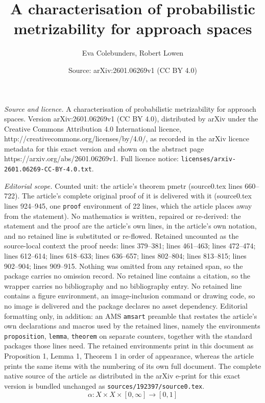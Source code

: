 \documentclass[10pt,a4paper]{amsart}
\title{A characterisation of probabilistic metrizability for approach spaces}
\author{Eva Colebunders, Robert Lowen}
\date{Source: arXiv:2601.06269v1 (CC BY 4.0)}
\renewcommand{\a}{\ensuremath{\alpha}}
\def\rw{\rightarrow}
\begin{document}
\maketitle

\noindent\emph{Source and licence.} A characterisation of probabilistic metrizability for approach spaces. Version arXiv:2601.06269v1 (CC BY 4.0), distributed by arXiv under the Creative Commons Attribution 4.0 International licence, http://creativecommons.org/licenses/by/4.0/, as recorded in the arXiv licence metadata for this exact version and shown on the abstract page https://arxiv.org/abs/2601.06269v1. Full licence notice: \texttt{licenses/arxiv-2601.06269-CC-BY-4.0.txt}.\par\smallskip

\noindent\textit{Editorial scope.} Counted unit: the article's theorem pmetr (source0.tex lines 660--722). The article's complete original proof of it is delivered with it (source0.tex lines 924--945, one \texttt{proof} environment of 22 lines, which the article places away from the statement). No mathematics is written, repaired or re-derived: the statement and the proof are the article's own lines, in the article's own notation, and no retained line is substituted or re-flowed.  Retained uncounted as the source-local context the proof needs: lines 379--381; lines 461--463; lines 472--474; lines 612--614; lines 618--633; lines 636--657; lines 802--804; lines 813--815; lines 902--904; lines 909--915.  Nothing was omitted from any retained span, so the package carries no omission record.  No retained line contains a citation, so the wrapper carries no bibliography and no bibliography entry.  No retained line contains a figure environment, an image-inclusion command or drawing code, so no image is delivered and the package declares no asset dependency.  Editorial formatting only, in addition: an AMS \texttt{amsart} preamble that restates the article's own declarations and macros used by the retained lines, namely the environments \texttt{proposition}, \texttt{lemma}, \texttt{theorem} on separate counters, together with the standard packages those lines need.  The retained environments print in this document as Proposition 1, Lemma 1, Theorem 1 in order of appearance, whereas the article prints the same items with the numbering of its own full document.  The complete native source of the article as distributed in the arXiv e-print for this exact version is bundled unchanged as \texttt{sources/192397/source0.tex}.
\begin{equation}\label{PrMet}
\a: X \times X \times [0,\infty] \rw [0,1]
\end{equation}
\end{document}
